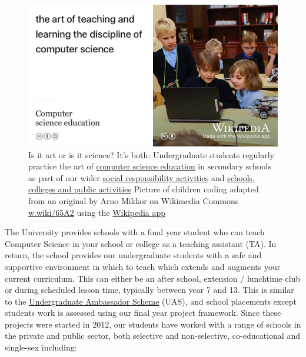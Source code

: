 \documentclass[
  12pt,
]{book}
\begin{document}
\begin{figure}

{\centering \includegraphics[width=0.98\linewidth]{images/computer-science-education} 

}

\caption{Is it art or is it science? It's both: Undergraduate students regularly practice the art of \href{https://en.wikipedia.org/wiki/Computer_science_education}{computer science education} in secondary schools as part of our wider \href{https://www.cs.manchester.ac.uk/connect/social-responsibility/}{social responsibility activities} \citep{m2020, m20202} and \href{https://www.cs.manchester.ac.uk/connect/schools-colleges-public/}{schools, colleges and public activities} Picture of children coding adapted from an original by Arno Mikkor on Wikimedia Commons \href{https://w.wiki/65A2}{w.wiki/65A2} using the \href{https://apps.apple.com/us/app/wikipedia/id324715238}{Wikipedia app}}\label{fig:unnamed-chunk-5}
\end{figure}

The University provides schools with a final year student who can teach Computer Science in your school or college as a teaching assistant (TA). In return, the school provides our undergraduate students with a safe and supportive environment in which to teach which extends and augments your current curriculum. This can either be an after school, extension / lunchtime club or during scheduled lesson time, typically between year 7 and 13. This is similar to the \href{https://en.wikipedia.org/wiki/Undergraduate_Ambassadors_Scheme}{Undergraduate Ambassador Scheme} (UAS), \citep{uas, Cooper2005} and school placements \citep{Moller2019} except students work is assessed using our final year project framework. \citep{COMP30030, COMP30040} Since these projects were started in 2012, our students have worked with a range of schools in the private and public sector, both selective and non-selective, co-educational and single-sex including:
\end{document}

